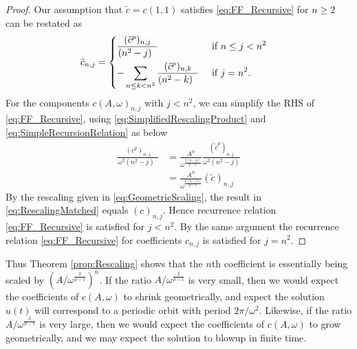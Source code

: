 \documentclass{article}
\begin{document}
\begin{proof}
	
Our  assumption that $ \tilde{c} = c(1,1)$ satisfies \eqref{eq:FF_Recursive} for $n \geq 2$ can be restated as 
	\begin{align}  \label{eq:SimpleRecursionRelation}
	\tilde{c}_{n,j} &= 
	\begin{dcases} 
	\frac{(\tilde{c}^p)_{n,j} }{		(n^2-j) \;\;}
	& \mbox{ if } n\leq j<n^2  \\
 -
	\sum_{n \leq k < n^2} \frac{(\tilde{c}^p)_{n,k} }{		(n^2-k) \;\;}
	& \mbox{ if } j = n^2 .
	\end{dcases}
	\end{align}
	For the components $c(A,\omega)_{n,j}$ with $j < n^2$, we can simplify the RHS of \eqref{eq:FF_Recursive}, using \eqref{eq:SimplifiedRescalingProduct} and \eqref{eq:SimpleRecursionRelation} as below  
	\begin{align} \nonumber 
	\frac{(c^p)_{n,j} }{ \omega^2		(n^2-j) \;\;} &=
	 \frac{A^{n}}{ \omega^{\frac{2(n-p)}{p-1}}  }
	  \frac{(\tilde{c}^p)_{n,j}}{\omega^2(n^2-j)}
	   \\
		& = \frac{A^n}{ \omega^{\frac{2(n-1)}{p-1}}  } (\tilde{c} )_{n,j} %
\label{eq:RescalingMatched}
	\end{align} 
	By the rescaling given in \eqref{eq:GeometricScaling}, the result in \eqref{eq:RescalingMatched} equals $ (c)_{n,j}$. Hence  recurrence relation  \eqref{eq:FF_Recursive} is satisfied for $ j<n^2$.  
By the same argument the recurrence relation \eqref{eq:FF_Recursive} for coefficients $ c_{n,j}$ is satisfied for $ j=n^2$.  
	
	
\end{proof}

Thus 
Theorem \ref{prop:Rescaling} shows that the $n$th coefficient is essentially being scaled by 
 $ \left(  A / \omega^{\frac{2}{p-1}  } \right)^n$.  
 If the ratio $A / \omega^{\frac{2}{p-1}} $ is very small, then we would expect the coefficients of $ c(A,\omega)$ to shrink geometrically, and expect the solution $u(t)$ will correspond to a periodic orbit with period  $2 \pi / \omega^2$. 
 Likewise, if the ratio $A /\omega^{\frac{2}{p-1}} $ is very large, then we would expect the coefficients of $ c(A,\omega)$ to grow geometrically, and we may expect the solution to blowup in finite time. 
 
\end{document}
